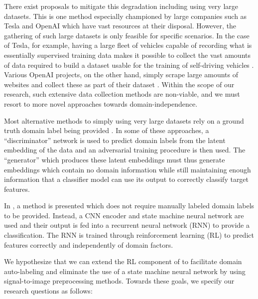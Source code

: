 There exist proposals to mitigate this degradation including using very large datasets.
This is one method especially championed by large companies such as Tesla and OpenAI which have vast resources at their disposal.
However, the gathering of such large datasets is only feasible for specific scenarios.
In the case of Tesla, for example, having a large fleet of vehicles capable of recording what is essentially supervised training data makes it possible to collect the vast amounts of data required to build a dataset usable for the training of self-driving vehicles \cite{tesla2017data}.
Various OpenAI projects, on the other hand, simply scrape large amounts of websites and collect these as part of their dataset \cite{brown2020language}.
Within the scope of our research, such extensive data collection methods are non-viable, and we must resort to more novel approaches towards domain-independence.

Most alternative methods to simply using very large datasets rely on a ground truth domain label being provided \cite{jiang2018towards,xue2020deepmv}.
In some of these approaches, a ``discriminator'' network is used to predict domain labels from the latent embedding of the data and an adversarial training procedure is then used.
The ``generator'' which produces these latent embeddings must thus generate embeddings which contain no domain information while still maintaining enough information that a classifier model can use its output to correctly classify target features.

In \cite{ma2021location}, a method is presented which does not require manually labeled domain labels to be provided.
Instead, a CNN encoder and state machine neural network are used and their output is fed into a recurrent neural network (RNN) to provide a classification.
The RNN is trained through reinforcement learning (RL) to predict features correctly and independently of domain factors.

We hypothesize that we can extend the RL component of \cite{ma2021location} to facilitate domain auto-labeling and eliminate the use of a state machine neural network by using signal-to-image preprocessing methods.
Towards these goals, we specify our research questions as follows:

